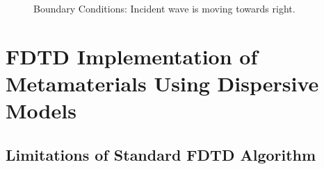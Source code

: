 \documentclass[10pt,A4paper]{report}
\begin{document}
\begin{figure}[H]
\mbox{\quad{}}
\caption{Boundary Conditions: Incident wave is moving towards right.}
\label{Boundary-Conditions}
\end{figure}

\chapter{FDTD Implementation of Metamaterials Using Dispersive Models}

\section{Limitations of Standard FDTD Algorithm}
\end{document}
